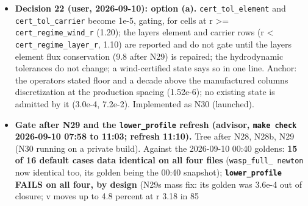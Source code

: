 \documentclass[english,a4paper]{my_memo}
\begin{document}
\begin{itemize}
  of the candidate 5.93e-4 (N = 500) -\textgreater{} 2.47e-4 (N = 1000), ratio 2.40,
  remap control 1.5e-5, Richardson limit 1.31e-4: \textbf{78 percent of the row is
  discretization}; element flux spread in the layer \textbf{39.3 -\textgreater{} 9.79} (He),
  37.3 -\textgreater{} 9.09 (H), the wind 2.6e-2 -\textgreater{} 2.7e-2, the escape window 2.0e-3.
  Memo: sections 3 (mass closure) and 6 (the reload) marked CLOSED by N29
  with the readings; section 5 rewritten; section 7\textquotesingle s proposal re-stated
  with the new floors and \textbf{option (a) supported as written} (1e-5 gating at
  r \textgreater= \texttt{cert\_regime\_wind\_r}, the layer reported and not gating); two of its
  three prerequisites discharged, the layer\textquotesingle s flux conservation (9.8)
  standing. No proposal certifies either candidate (wind element row 3.05e-4
  and 7.2e-2 against a proposed 1e-5). \texttt{certification} 42/0. Reported: the
  iron wind row of the atomic candidate rose 18x between the two chaotic
  states (a size, not a trend); the derivative anchor is not measured at the
  loaded state itself (needs the probe under \texttt{stationary\ evaluate},
  \texttt{steady\_newton.f90}).
\item
  \textbf{Decision 22 (user, 2026-09-10): option (a).} \texttt{cert\_tol\_element} and
  \texttt{cert\_tol\_carrier} become 1e-5, gating, for cells at r \textgreater= \texttt{cert\_regime\_wind\_r}
  (1.20); the layer\textquotesingle s element and carrier rows (r \textless{} \texttt{cert\_regime\_layer\_r},
  1.10) are reported and do not gate until the layer\textquotesingle s element flux
  conservation (9.8 after N29) is repaired; the hydrodynamic tolerances do
  not change; a wind-certified state says so in one line. Anchor: the
  operator\textquotesingle s stated floor and a decade above the manufactured column\textquotesingle s
  discretization at the production spacing (1.52e-6); no existing state is
  admitted by it (3.0e-4, 7.2e-2). Implemented as N30 (launched).
\item
  \textbf{Gate after N29 and the \texttt{lower\_profile} refresh (advisor, \texttt{make\ check}
  2026-09-10 07:58 to 11:03; refresh 11:10).} Tree after N28, N28b, N29
  (N30 running on a private build). Against the 2026-09-10 00:40 goldens:
  \textbf{15 of 16 default cases data identical on all four files} (\texttt{wasp\_full\_\ newton} now identical too, its golden being the 00:40 snapshot);
  \textbf{\texttt{lower\_profile} FAILS on all four, by design} (N29\textquotesingle s mass fix: its
  golden was 3.6e-4 out of closure; v moves up to 4.8 percent at r 3.18 in 85

\end{itemize}
\end{document}
